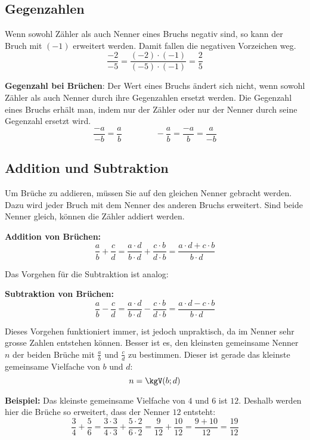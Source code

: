 \subsection{Gegenzahlen}

Wenn sowohl Zähler als auch Nenner eines Bruchs negativ sind, so kann der Bruch mit $(-1)$ erweitert werden. Damit fallen die negativen Vorzeichen weg.
\[
  \frac{-2}{-5} = \frac{(-2)\cdot(-1)}{(-5)\cdot(-1)} = \frac{2}{5}
\]
\begin{theorem}
  \textbf{Gegenzahl bei Brüchen}: Der Wert eines Bruchs ändert sich nicht, wenn sowohl Zähler als auch Nenner durch ihre Gegenzahlen ersetzt werden. Die Gegenzahl eines Bruchs erhält man, indem nur der Zähler oder nur der Nenner durch seine Gegenzahl ersetzt wird.
  \[
    \frac{-a}{-b} = \frac{a}{b} \qquad\qquad -\frac{a}{b} = \frac{-a}{b} = \frac{a}{-b}
  \]
\end{theorem}

\subsection{Addition und Subtraktion}

Um Brüche zu addieren, müssen Sie auf den gleichen Nenner gebracht werden. Dazu wird jeder Bruch mit dem Nenner des anderen Bruchs erweitert. Sind beide Nenner gleich, können die Zähler addiert werden.
\begin{theorem}
  \textbf{Addition von Brüchen:}
  \[
    \frac{a}{b}+\frac{c}{d} = \frac{a\cdot d}{b\cdot d}+\frac{c\cdot b}{d\cdot b} = \frac{a\cdot d+c\cdot b}{b\cdot d}
  \]
\end{theorem}
Das Vorgehen für die Subtraktion ist analog:
\begin{theorem}
  \textbf{Subtraktion von Brüchen:}
  \[
    \frac{a}{b}-\frac{c}{d} = \frac{a\cdot d}{b\cdot d}-\frac{c\cdot b}{d\cdot b} = \frac{a\cdot d-c\cdot b}{b\cdot d}
  \]
\end{theorem}
Dieses Vorgehen funktioniert immer, ist jedoch unpraktisch, da im Nenner sehr grosse Zahlen entstehen können. Besser ist es, den kleinsten gemeinsame Nenner $n$ der beiden Brüche mit $\frac{a}{b}$ und $\frac{c}{d}$ zu bestimmen. Dieser ist gerade das kleinste gemeinsame Vielfache von $b$ und $d$:
\[
  n = \kgV(b;d)
\]
\begin{example}
  \textbf{Beispiel:} Das kleinste gemeinsame Vielfache von $4$ und $6$ ist $12$. Deshalb werden hier die Brüche so erweitert, dass der Nenner $12$ entsteht:
  \[
    \frac{3}{4}+\frac{5}{6} = \frac{3\cdot 3}{4\cdot 3}+\frac{5\cdot 2}{6\cdot 2} = \frac{9}{12}+\frac{10}{12} = \frac{9+10}{12} = \frac{19}{12}
  \]
\end{example}

